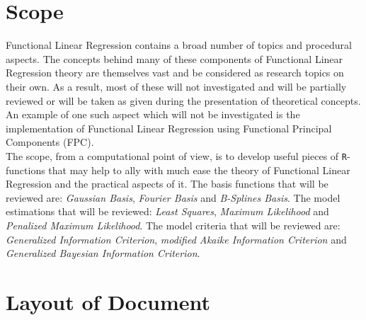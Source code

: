 \section{Scope}

Functional Linear Regression contains a broad number of topics and procedural aspects. The concepts behind many of these components of Functional Linear Regression theory are themselves vast and be considered as research topics on their own. As a result, most of these will not investigated and will be partially reviewed or will be taken as given during the presentation of theoretical concepts. An example of one such aspect which will not be investigated is the implementation of Functional Linear Regression using Functional Principal Components (FPC).\\
The scope, from a computational point of view, is to develop useful pieces of \texttt{R}-functions that may help to ally with much ease the theory of Functional Linear Regression and the practical aspects of it. The basis functions that will be reviewed are: \textit{Gaussian Basis}, \textit{Fourier Basis} and \textit{B-Splines Basis}. The model estimations that will be reviewed: \textit{Least Squares}, \textit{Maximum Likelihood} and \textit{Penalized Maximum Likelihood}. The model criteria that will be reviewed are: \textit{Generalized Information Criterion}, \textit{modified Akaike Information Criterion} and \textit{Generalized Bayesian Information Criterion}.


\section{Layout of Document}

